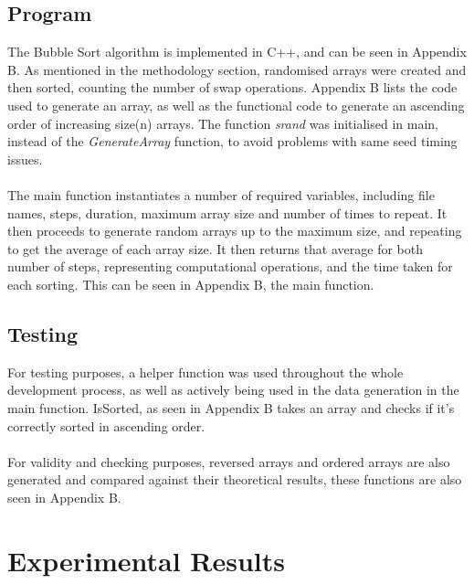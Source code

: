 \documentclass[]{article}
\begin{document}
\subsection{Program}
The Bubble Sort algorithm is implemented in C++, and can be seen in Appendix B. As mentioned in the methodology section, randomised arrays were created and then sorted, counting the number of swap operations. Appendix B lists the code used to generate an array, as well as the functional code to generate an ascending order of increasing size(n) arrays. The function \textit{srand} was initialised in main, instead of the \textit{GenerateArray} function, to avoid problems with same seed timing issues.
\\\\
The main function instantiates a number of required variables, including file names, steps, duration, maximum array size and number of times to repeat. It then proceeds to generate random arrays up to the maximum size, and repeating to get the average of each array size. It then returns that average for both number of steps, representing computational operations, and the time taken for each sorting. This can be seen in Appendix B, the main function.

\subsection{Testing}
For testing purposes, a helper function was used throughout the whole development process, as well as actively being used in the data generation in the main function. IsSorted, as seen in Appendix B takes an array and checks if it's correctly sorted in ascending order. 
\\\\
For validity and checking purposes, reversed arrays and ordered arrays are also generated and compared against their theoretical results, these functions are also seen in Appendix B.
\section{Experimental Results}
\end{document}
